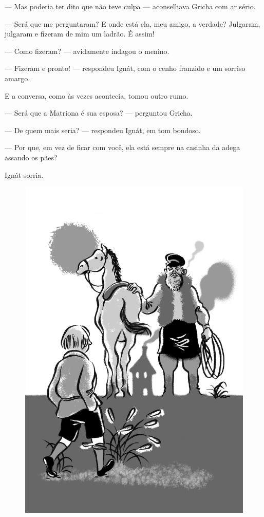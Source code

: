 --- Mas poderia ter dito que não teve culpa --- aconselhava Gricha com
ar sério.

--- Será que me perguntaram? E onde está ela, meu amigo, a verdade?
Julgaram, julgaram e fizeram de mim um ladrão. É assim!

--- Como fizeram? --- avidamente indagou o menino.

--- Fizeram e pronto! --- respondeu Ignát, com o cenho franzido e um
sorriso amargo.

E a conversa, como às vezes acontecia, tomou outro rumo.

--- Será que a Matriona é sua esposa? --- perguntou Gricha.

--- De quem mais seria? --- respondeu Ignát, em tom bondoso.

--- Por que, em vez de ficar com você, ela está sempre na casinha da
adega assando os pães?

Ignát sorria.

\begin{figure}%
\vspace*{-1.6cm}
\hspace*{-2.3cm}\includegraphics{./imgs/cena9.jpg}
\end{figure}

